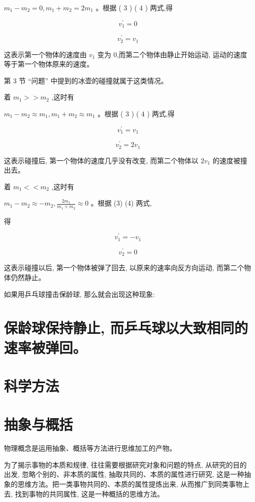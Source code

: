 \documentclass[10pt]{article}
\begin{document}
\({m}_{1} - {m}_{2} = 0,{m}_{1} + {m}_{2} = 2{m}_{1}\) 。根据 ( 3 ) ( 4 ) 两式,得

\[
{v}_{1}^{\prime } = 0
\]

\[
{v}_{2}^{\prime } = {v}_{1}
\]

这表示第一个物体的速度由 \({v}_{1}\) 变为 0,而第二个物体由静止开始运动, 运动的速度等于第一个物体原来的速度。

第 3 节 “问题” 中提到的冰壶的碰撞就属于这类情况。

着 \({m}_{1} > > {m}_{2}\) ,这时有

\({m}_{1} - {m}_{2} \approx {m}_{1},{m}_{1} + {m}_{2} \approx {m}_{1}\) 。根据 ( 3 ) ( 4 ) 两式,得

\[
{v}_{1}^{\prime } = {v}_{1}
\]

\[
{v}_{2}^{\prime } = 2{v}_{1}
\]

这表示碰撞后, 第一个物体的速度几乎没有改变, 而第二个物体以 \(2{v}_{1}\) 的速度被撞出去。

着 \({m}_{1} < < {m}_{2}\) ,这时有

\({m}_{1} - {m}_{2} \approx - {m}_{2},\frac{2{m}_{1}}{{m}_{1} + {m}_{2}} \approx 0\) 。根据 (3) (4) 两式,

得

\[
{v}_{1}^{\prime } = - {v}_{1}
\]

\[
{v}_{2}^{\prime } = 0
\]

这表示碰撞以后, 第一个物体被弹了回去, 以原来的速率向反方向运动, 而第二个物体仍然静止。

如果用乒乓球撞击保龄球, 那么就会出现这种现象:

\section*{保龄球保持静止, 而乒乓球以大致相同的速率被弹回。}

\section*{科学方法}

\section*{抽象与概括}

物理概念是运用抽象、概括等方法进行思维加工的产物。

为了揭示事物的本质和规律, 往往需要根据研究对象和问题的特点, 从研究的目的出发, 忽略个别的、非本质的属性, 抽取共同的、本质的属性进行研究, 这是一种抽象的思维方法。把一类事物共同的、本质的属性提炼出来, 从而推广到同类事物上去, 找到事物的共同属性, 这是一种概括的思维方法。
\end{document}

